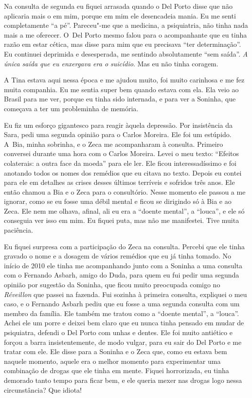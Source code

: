 Na consulta de segunda eu fiquei arrasada quando o Del Porto
disse que não aplicaria mais o  em mim, porque em mim ele desencadeia
mania. Eu me senti completamente ``a pé''. Pareceu"-me que a medicina, a
psiquiatria, não tinha nada mais a me oferecer. O~Del Porto mesmo falou
para o acompanhante que eu tinha razão em estar cética, mas disse para
mim que eu precisava ``ter determinação''. Eu continuei deprimida e
desesperada, me sentindo absolutamente ``sem saída''. \emph{A única
saída que eu enxergava era o suicídio}. Mas eu não tinha coragem.

A Tina estava aqui nessa época e me ajudou muito, foi muito carinhosa e
me fez muita companhia. Eu me sentia super bem quando estava com ela.
Ela veio ao Brasil para me ver, porque eu tinha sido internada, e para
ver a Soninha, que começava a ter um probleminha de memória.

Eu fiz um esforço gigantesco para reagir àquela depressão. Por
insistência da Sara, pedi uma segunda opinião para o Carlos Moreira. Ele
foi um estúpido. A~Bia, minha sobrinha, e o Zeca me acompanharam à
consulta. Primeiro conversei durante uma hora com o Carlos Moreira.
Levei o meu texto: ``Efeitos colaterais: a outra face da moeda'' para
ele ler. Ele ficou interessadíssimo e foi anotando todos os nomes dos
remédios que eu citava no texto. Depois eu contei para ele em detalhes
as crises desses últimos terríveis e sofridos três anos. Ele então
chamou a Bia e o Zeca para o consultório. Nesse momento ele passou a me
ignorar, como se eu fosse uma débil mental e ficou se dirigindo só à Bia
e ao Zeca. Ele nem me olhava, afinal, ali eu era a ``doente mental'', a
``louca'', e ele só conseguia ver isso em mim. Eu fiquei puta, mas não
me manifestei. Tive muita paciência.

Eu fiquei surpresa com a participação do Zeca na consulta. Percebi que
ele tinha gravado o nome e a dosagem de vários remédios que eu já tinha
tomado. No início de 2010 ele tinha me acompanhando junto com
a Soninha a uma consulta com o Fernando Asbarh, amigo do Duda, para quem
eu fui pedir uma segunda opinião por sugestão da Soninha, que ficou
muito preocupada comigo no \emph{Réveillon} que passei na fazenda. Fui
sozinha à primeira consulta, expliquei o meu caso, e o Fernando Asbarh
pediu que eu fosse a uma segunda consulta com um membro da família. Ele
também me tratou como a ``doente mental'', a ``louca''. Achei ele um
porre e deixei bem claro que eu nunca tinha pensado em mudar de
psiquiatra, defendi o Del Porto com unhas e dentes. Ele foi muito
antiético e forçou a barra insistentemente, de modo vulgar, para eu sair
do Del Porto e me tratar com ele. Ele disse para a Soninha e o Zeca que,
como eu estava bem naquele momento, aquele era o melhor momento para
experimentar uma combinação de drogas que ele tinha em mente. Fiquei
horrorizada, eu tinha demorado tanto tempo para ficar bem, e ele queria
mexer nas drogas logo nessa circunstância? Que idiota!

